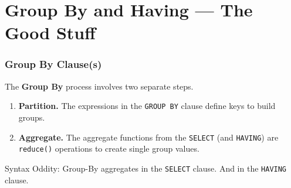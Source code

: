 \documentclass{beamer}
\begin{document}
\section{Group By and Having --- The Good Stuff}
\begin{frame}
    \frametitle{Group By Clause(s)}

    The \textbf{Group By} process involves two separate steps.
    \begin{enumerate}
        \item \textbf{Partition.} The expressions in the \texttt{GROUP BY} clause define keys to build groups.

        \vspace{1em}
        \item \textbf{Aggregate.} The aggregate functions from the \texttt{SELECT} (and \texttt{HAVING}) are \texttt{reduce()} operations to create single group values.
    \end{enumerate}

    \vspace{1em}

    Syntax Oddity: Group-By aggregates in the \texttt{SELECT} clause.
    And in the \texttt{HAVING} clause.

\end{frame}

%
%
%
%
%
\end{document}
